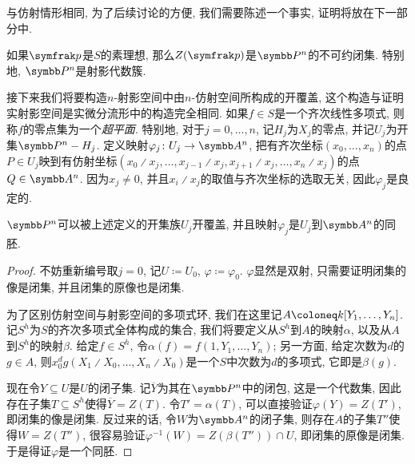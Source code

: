 与仿射情形相同, 为了后续讨论的方便, 我们需要陈述一个事实, 证明将放在下一部分中.

\begin{proposition}\label{prop:projectiveprimeirreducible}
    如果$\ideal{p}$是$S$的素理想, 那么$Z(\ideal{p})$是$\PP^n$的不可约闭集. 特别地, $\PP^n$是射影代数簇.
\end{proposition}

接下来我们将要构造$n$-射影空间中由$n$-仿射空间所构成的开覆盖, 这个构造与证明实射影空间是实微分流形中的构造\parencite[4--5, Definition 2.4]{flaherty_riemannian_1992}完全相同. 如果$f\in S$是一个齐次线性多项式, 则称$f$的零点集为一个\emph{超平面}. 特别地, 对于$j=0, \dotsc, n$, 记$H_j$为$X_j$的零点, 并记$U_j$为开集$\PP^n-H_j$. 定义映射$\varphi_j\colon U_j\to \AF^n$, 把有齐次坐标$(x_0, \dotsc, x_n)$的点$P\in U_j$映到有仿射坐标$(x_0{\divslash}x_j, \dotsc, x_{j-1}{\divslash}x_j, x_{j+1}{\divslash}x_j, \dotsc,  x_n{\divslash}x_j)$的点$Q\in \AF^n$. 因为$x_j\neq 0$, 并且$x_i{\divslash}x_j$的取值与齐次坐标的选取无关, 因此$\varphi_j$是良定的.

\begin{proposition}\label{prop:projspaceopencoverhomeo}
    $\PP^n$可以被上述定义的开集族$U_j$开覆盖, 并且映射$\varphi_j$是$U_j$到$\AF^n$的同胚.
\end{proposition}

\begin{proof}
    不妨重新编号取$j=0$, 记$U\coloneq U_0$, $\varphi\coloneq \varphi_0$. $\varphi$显然是双射, 只需要证明闭集的像是闭集, 并且闭集的原像也是闭集.

    为了区别仿射空间与射影空间的多项式环, 我们在这里记$A\coloneq \kk [Y_1, \dotsc, Y_n]$. 记$S^h$为$S$的齐次多项式全体构成的集合, 我们将要定义从$S^h$到$A$的映射$\alpha$, 以及从$A$到$S^h$的映射$\beta$. 给定$f\in S^h$, 令$\alpha(f)=f(1, Y_1, \dotsc, Y_n)$; 另一方面, 给定次数为$d$的$g\in A$, 则$x_0^dg(X_1{\divslash}X_0, \dotsc, X_n{\divslash}X_0)$是一个$S$中次数为$d$的多项式, 它即是$\beta(g)$.

    现在令$Y\subseteq U$是$U$的闭子集. 记$\overline{Y}$为其在$\PP^n$中的闭包, 这是一个代数集, 因此存在子集$T\subseteq S^h$使得$\overline{Y}=Z(T)$. 令$T'=\alpha(T)$, 可以直接验证$\varphi(Y)=Z(T')$, 即闭集的像是闭集. 反过来的话, 令$W$为$\AF^n$的闭子集, 则存在$A$的子集$T''$使得$W=Z(T'')$, 很容易验证$\varphi^{-1}(W) = Z(\beta(T''))\cap U$, 即闭集的原像是闭集. 于是得证$\varphi$是一个同胚.
\end{proof}

